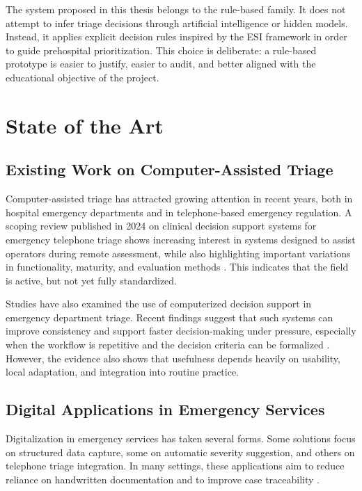 \documentclass[a4paper,12pt,oneside]{report}
\begin{document}
The system proposed in this thesis belongs to the rule-based family. It does not attempt to infer triage decisions through artificial intelligence or hidden models. Instead, it applies explicit decision rules inspired by the ESI framework in order to guide prehospital prioritization. This choice is deliberate: a rule-based prototype is easier to justify, easier to audit, and better aligned with the educational objective of the project.

\section{State of the Art}

\subsection{Existing Work on Computer-Assisted Triage}

Computer-assisted triage has attracted growing attention in recent years, both in hospital emergency departments and in telephone-based emergency regulation. A scoping review published in 2024 on clinical decision support systems for emergency telephone triage shows increasing interest in systems designed to assist operators during remote assessment, while also highlighting important variations in functionality, maturity, and evaluation methods \cite{michel2024}. This indicates that the field is active, but not yet fully standardized.

Studies have also examined the use of computerized decision support in emergency department triage. Recent findings suggest that such systems can improve consistency and support faster decision-making under pressure, especially when the workflow is repetitive and the decision criteria can be formalized \cite{cetin2023,morlotti2024}. However, the evidence also shows that usefulness depends heavily on usability, local adaptation, and integration into routine practice.

\subsection{Digital Applications in Emergency Services}

Digitalization in emergency services has taken several forms. Some solutions focus on structured data capture, some on automatic severity suggestion, and others on telephone triage integration. In many settings, these applications aim to reduce reliance on handwritten documentation and to improve case traceability \cite{morlotti2024,islam2021}.
\end{document}
